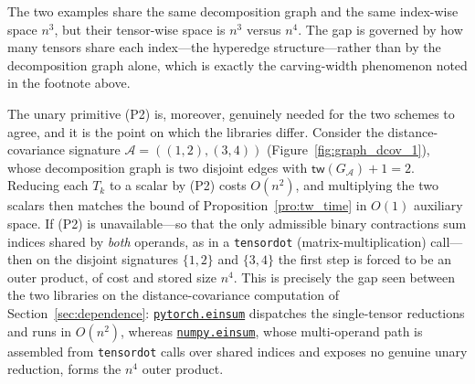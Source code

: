 \documentclass[sn-mathphys, natbib=false]{sn-jnl}
\newcommand{\libref}[2]{\href{#2}{\texttt{#1}}}
\theoremstyle{plain}
\theoremstyle{definition}
\newcommand{\treewidthp}[1]{\mathsf{tw}(#1)}
\newcommand{\less}{O}
\newif\ifshowchanges
\newcommand{\rev}[1]{%
  \ifshowchanges
    {\color{red} #1}%
  \else
    #1%
  \fi
}
\newcommand{\numpyeinsum}{\libref{numpy.einsum}{https://numpy.org/doc/2.1/reference/generated/numpy.einsum.html}}
\newcommand{\torcheinsum}{\libref{pytorch.einsum}{https://pytorch.org/docs/stable/generated/torch.einsum.html}}
\def\calA{\mathcal{A}}
\begin{document}
\begin{bibunit}[agsm]
\rev{The two examples share the same decomposition graph and the same index-wise space $n^3$, but their tensor-wise space is $n^3$ versus $n^4$. The gap is governed by how many tensors share each index---the hyperedge structure---rather than by the decomposition graph alone, which is exactly the carving-width phenomenon noted in the footnote above.}

\rev{The unary primitive (P2) is, moreover, genuinely needed for the two schemes to agree, and it is the point on which the libraries differ. Consider the distance-covariance signature $\calA = ((1,2),(3,4))$ (Figure~\ref{fig:graph_dcov_1}), whose decomposition graph is two disjoint edges with $\treewidthp{G_\calA}+1 = 2$. Reducing each $T_k$ to a scalar by (P2) costs $\less(n^2)$, and multiplying the two scalars then matches the bound of Proposition~\ref{pro:tw_time} in $\less(1)$ auxiliary space. If (P2) is unavailable---so that the only admissible binary contractions sum indices shared by \emph{both} operands, as in a \texttt{tensordot} (matrix-multiplication) call---then on the disjoint signatures $\{1,2\}$ and $\{3,4\}$ the first step is forced to be an outer product, of cost and stored size $n^4$. This is precisely the gap seen between the two libraries on the distance-covariance computation of Section~\ref{sec:dependence}: \torcheinsum{} dispatches the single-tensor reductions and runs in $\less(n^2)$, whereas \numpyeinsum{}, whose multi-operand path is assembled from \texttt{tensordot} calls over shared indices and exposes no genuine unary reduction, forms the $n^4$ outer product.}


\end{bibunit}
\end{document}
